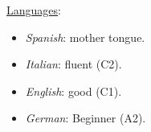 \addskill%
{%
    \underline{Languages}:%
    \begin{multicols}{2}
        \begin{itemize}[nosep, rightmargin=0cm,after*={\vspace{-\baselineskip}}]%
            \item {\em Spanish}: mother tongue.
            \item {\em Italian}: fluent (C2).
            \columnbreak
            \item {\em English}: good (C1).
            \item {\em German}: Beginner (A2).
        \end{itemize}%
    \end{multicols}
}%

%

